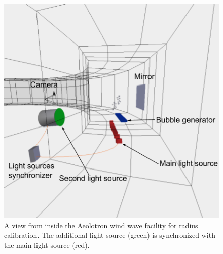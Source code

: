 			\begin{figure}
				\includegraphics[scale=.5]{images/radius_setup_fancy.png}
				\caption{A view from inside the Aeolotron wind wave facility for radius calibration. The additional light source (green) is synchronized with the main light source (red).}
				\label{fig:radius_calibration_setup}
			\end{figure}
			
